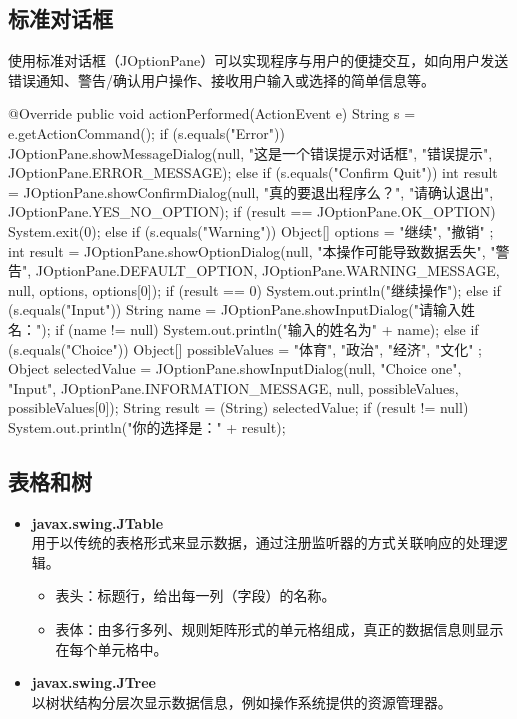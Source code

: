 \subsection{标准对话框}

使用标准对话框（JOptionPane）可以实现程序与用户的便捷交互，如向用户发送
错误通知、警告/确认用户操作、接收用户输入或选择的简单信息等。


\begin{javaCode}
  @Override
  public void actionPerformed(ActionEvent e) {
    String s = e.getActionCommand();
    if (s.equals("Error")) {
      JOptionPane.showMessageDialog(null, "这是一个错误提示对话框", "错误提示",
      JOptionPane.ERROR_MESSAGE);
    } else if (s.equals("Confirm Quit")) {
      int result = JOptionPane.showConfirmDialog(null, "真的要退出程序么？",
      "请确认退出", JOptionPane.YES_NO_OPTION);
      if (result == JOptionPane.OK_OPTION) {
        System.exit(0);
      }
    } else if (s.equals("Warning")) {
      Object[] options = { "继续", "撤销" };
      int result = JOptionPane.showOptionDialog(null, "本操作可能导致数据丢失",
      "警告", JOptionPane.DEFAULT_OPTION,
      JOptionPane.WARNING_MESSAGE, null, options, options[0]);
      if (result == 0)
      System.out.println("继续操作");
    } else if (s.equals("Input")) {
      String name = JOptionPane.showInputDialog("请输入姓名：");
      if (name != null) 
      System.out.println("输入的姓名为" + name);
    } else if (s.equals("Choice")) {
      Object[] possibleValues = { "体育", "政治", "经济", "文化" };
      Object selectedValue = JOptionPane.showInputDialog(null,
      "Choice one", "Input", JOptionPane.INFORMATION_MESSAGE,
      null, possibleValues, possibleValues[0]);
      String result = (String) selectedValue;
      if (result != null) 
      System.out.println("你的选择是：" + result);
    }
  }
\end{javaCode}

\subsection{表格和树}

\begin{itemize}
\item {\bf javax.swing.JTable}\\
用于以传统的表格形式来显示数据，通过注册监听器的方式关联响应的处理逻辑。
\begin{itemize}
\item 表头：标题行，给出每一列（字段）的名称。
\item 表体：由多行多列、规则矩阵形式的单元格组成，真正的数据信息则显示在每个单元格中。
\end{itemize}
\item {\bf javax.swing.JTree}\\
以树状结构分层次显示数据信息，例如操作系统提供的资源管理器。
\end{itemize}

